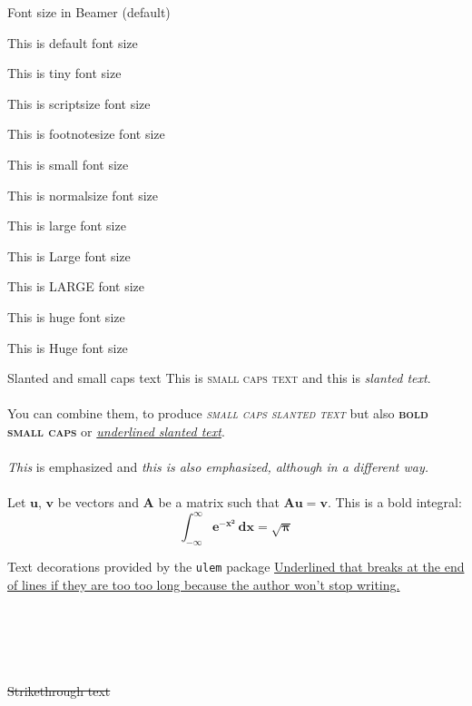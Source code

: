 \documentclass{beamer}
\begin{document}
\begin{frame}{Font size in Beamer (default)}

This is default font size

\tiny This is tiny font size

\scriptsize This is scriptsize font size

\footnotesize This is footnotesize font size

\small This is small font size

\normalsize This is normalsize font size

\large This is large font size

\Large This is Large font size

\LARGE This is LARGE font size

\huge This is huge font size

\Huge This is Huge font size

\end{frame}

\begin{frame}{Slanted and small caps text}
This is \textsc{small caps text} and this is
\textsl{slanted text}.\\~\\
You can combine them, to produce \textsl{\textsc{small
caps slanted text}} but also \textsc{\textbf{bold small caps}} or \textsl{\underline{underlined slanted text}}.\\~\\


\emph{This} is emphasized and \textit{\emph{this} is
also emphasized, although in a different way.}\\~\\


Let $\bm{u}$, $\bm{v}$ be vectors and $\bm{A}$ be a
matrix such that $\bm{Au}=\bm{v}$.
This is a bold integral:
\[
\bm{\int_{-\infty}^{\infty} e^{-x^2}\,dx=\sqrt{\pi} }
\]
\end{frame}

\begin{frame}{Text decorations provided by the \texttt{ulem} package}
\uline{Underlined that breaks at the end of lines if they are too too long because the author won’t stop writing.} \\~\\
 \\~\\
 \\~\\
\sout{Strikethrough text} \\~\\
 \\~\\
 \\~\\
\end{frame}
\end{document}
